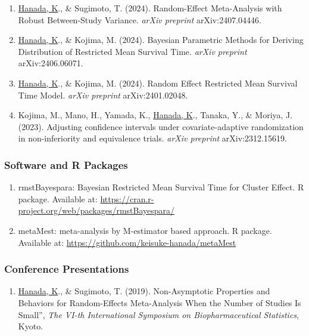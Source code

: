 \documentclass[
  12pt,
]{article}
\providecommand{\tightlist}{%
  \setlength{\itemsep}{0pt}\setlength{\parskip}{0pt}}
\begin{document}
\begin{enumerate}
\def\labelenumi{\arabic{enumi}.}
\tightlist
\item
  \underline{Hanada, K}., \& Sugimoto, T. (2024). Random-Effect
  Meta-Analysis with Robust Between-Study Variance. \emph{arXiv
  preprint} arXiv:2407.04446.
\item
  \underline{Hanada, K}., \& Kojima, M. (2024). Bayesian Parametric
  Methods for Deriving Distribution of Restricted Mean Survival Time.
  \emph{arXiv preprint} arXiv:2406.06071.
\item
  \underline{Hanada, K}., \& Kojima, M. (2024). Random Effect Restricted
  Mean Survival Time Model. \emph{arXiv preprint} arXiv:2401.02048.
\item
  Kojima, M., Mano, H., Yamada, K., \underline{Hanada, K}., Tanaka, Y.,
  \& Moriya, J. (2023). Adjusting confidence intervals under
  covariate-adaptive randomization in non-inferiority and equivalence
  trials. \emph{arXiv preprint} arXiv:2312.15619.
\end{enumerate}

\hypertarget{software-and-r-packages}{%
\subsubsection{Software and R Packages}\label{software-and-r-packages}}

\begin{enumerate}
\def\labelenumi{\arabic{enumi}.}
\tightlist
\item
  rmstBayespara: Bayesian Restricted Mean Survival Time for Cluster
  Effect. R package. Available at:
  \url{https://cran.r-project.org/web/packages/rmstBayespara/}
\item
  metaMest: meta-analysis by M-estimator based approach. R package.
  Available at: \url{https://github.com/keisuke-hanada/metaMest}
\end{enumerate}

\hypertarget{conference-presentations}{%
\subsubsection{Conference
Presentations}\label{conference-presentations}}

\begin{enumerate}
\def\labelenumi{\arabic{enumi}.}
\tightlist
\item
  \underline{Hanada, K}., \& Sugimoto, T. (2019). Non-Asymptotic
  Properties and Behaviors for Random-Effects Meta-Analysis When the
  Number of Studies Is Small'', \emph{The VI-th International Symposium
  on Biopharmaceutical Statistics}, Kyoto.
\end{enumerate}
\end{document}
